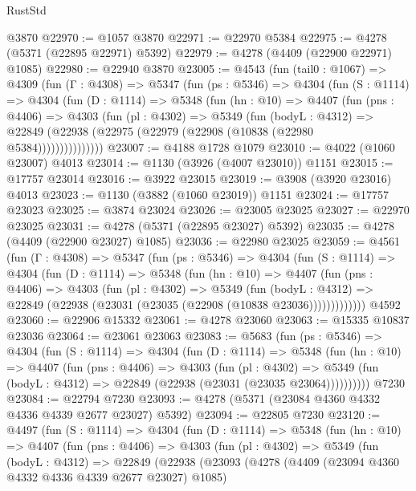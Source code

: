 \begin{lexlean}{RustStd}
\begin{coremodule}
    @3870
@22970 := @1057 @3870
@22971 := @22970 @5384
@22975 := @4278 (@5371 (@22895 @22971) @5392)
@22979 := @4278 (@4409 (@22900 @22971) @1085)
@22980 := @22940 @3870
@23005 := @4543
    (fun (tail0 : @1067) =>
    @4309
      (fun (Γ : @4308) =>
      @5347
        (fun (ps : @5346) =>
        @4304
          (fun (S : @1114) =>
          @4304
            (fun (D : @1114) =>
            @5348
              (fun (hn : @10) =>
              @4407
                (fun (pns : @4406) =>
                @4303
                  (fun (pl : @4302) =>
                  @5349
                    (fun (bodyL : @4312) =>
                    @22849 (@22938 (@22975 (@22979 (@22908 (@10838 (@22980 @5384)))))))))))))))
@23007 := @4188 @1728 @1079
@23010 := @4022 (@1060 @23007) @4013
@23014 := @1130 (@3926 (@4007 @23010)) @1151
@23015 := @17757 @23014
@23016 := @3922 @23015
@23019 := @3908 (@3920 @23016) @4013
@23023 := @1130 (@3882 (@1060 @23019)) @1151
@23024 := @17757 @23023
@23025 := @3874 @23024
@23026 := @23005 @23025
@23027 := @22970 @23025
@23031 := @4278 (@5371 (@22895 @23027) @5392)
@23035 := @4278 (@4409 (@22900 @23027) @1085)
@23036 := @22980 @23025
@23059 := @4561
    (fun (Γ : @4308) =>
    @5347
      (fun (ps : @5346) =>
      @4304
        (fun (S : @1114) =>
        @4304
          (fun (D : @1114) =>
          @5348
            (fun (hn : @10) =>
            @4407
              (fun (pns : @4406) =>
              @4303
                (fun (pl : @4302) =>
                @5349
                  (fun (bodyL : @4312) =>
                  @22849 (@22938 (@23031 (@23035 (@22908 (@10838 @23036)))))))))))))
    @4592
@23060 := @22906 @15332
@23061 := @4278 @23060
@23063 := @15335 @10837 @23036
@23064 := @23061 @23063
@23083 := @5683
    (fun (ps : @5346) =>
    @4304
      (fun (S : @1114) =>
      @4304
        (fun (D : @1114) =>
        @5348
          (fun (hn : @10) =>
          @4407
            (fun (pns : @4406) =>
            @4303
              (fun (pl : @4302) =>
              @5349 (fun (bodyL : @4312) => @22849 (@22938 (@23031 (@23035 @23064))))))))))
    @7230
@23084 := @22794 @7230
@23093 := @4278 (@5371 (@23084 @4360 @4332 @4336 @4339 @2677 @23027) @5392)
@23094 := @22805 @7230
@23120 := @4497
    (fun (S : @1114) =>
    @4304
      (fun (D : @1114) =>
      @5348
        (fun (hn : @10) =>
        @4407
          (fun (pns : @4406) =>
          @4303
            (fun (pl : @4302) =>
            @5349
              (fun (bodyL : @4312) =>
              @22849
                (@22938
                  (@23093
                    (@4278
                      (@4409 (@23094 @4360 @4332 @4336 @4339 @2677 @23027) @1085)

\end{coremodule}
\end{lexlean}
